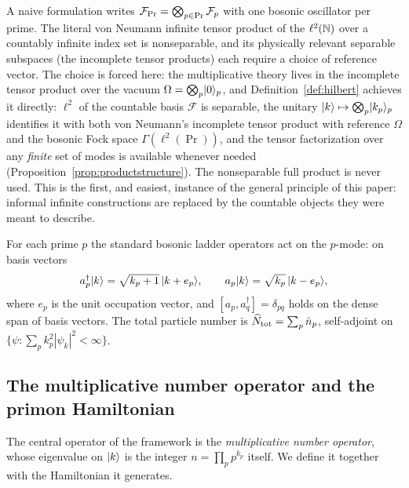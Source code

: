 \begin{remark}
A naive formulation writes $\mathcal{F}_{\Pr}=\bigotimes_{p\in\Pr}\mathcal{F}_{p}$ with one bosonic oscillator
per prime. The literal von Neumann infinite tensor product of the $\ell^{2}(\mathbb{N})$ over a
countably infinite index set is nonseparable, and its physically relevant separable subspaces
(the incomplete tensor products) each require a choice of reference vector. The choice is
forced here: the multiplicative theory lives in the incomplete tensor product over the
vacuum $\Omega=\bigotimes_{p}\lvert 0\rangle_{p}$, and Definition~\ref{def:hilbert} achieves it
directly: $\ell^{2}$ of the countable basis $\mathcal{F}$ is separable, the unitary
$\lvert k\rangle\mapsto\bigotimes_{p}\lvert k_{p}\rangle_{p}$ identifies it with both von Neumann's
incomplete tensor product with reference $\Omega$ and the bosonic Fock space
$\Gamma(\ell^{2}(\Pr))$, and the tensor factorization over any \emph{finite} set of modes is
available whenever needed (Proposition~\ref{prop:productstructure}). The nonseparable full
product is never used. This is the first, and easiest, instance of the
general principle of this paper: informal infinite constructions are replaced by the countable
objects they were meant to describe.
\end{remark}

For each prime $p$ the standard bosonic ladder operators act on the $p$-mode: on basis vectors
\begin{equation}
a_{p}^{\dagger}\lvert k\rangle=\sqrt{k_{p}+1}\,\lvert k+e_{p}\rangle,
\qquad
a_{p}\lvert k\rangle=\sqrt{k_{p}}\,\lvert k-e_{p}\rangle,
\end{equation}
where $e_{p}$ is the unit occupation vector, and $[a_{p},a_{q}^{\dagger}]=\delta_{pq}$ holds
on the dense span of basis vectors. The total particle number is
$\widehat{N}_{\mathrm{tot}}=\sum_{p}\hat n_{p}$, self-adjoint on
$\{\psi:\sum_{p}k_{p}^{2}|\psi_{k}|^{2}<\infty\}$.

\subsection{The multiplicative number operator and the primon Hamiltonian}

The central operator of the framework is the \emph{multiplicative number operator}, whose
eigenvalue on $\lvert k\rangle$ is the integer $n=\prod_{p}p^{k_{p}}$ itself. We define it together
with the Hamiltonian it generates.

